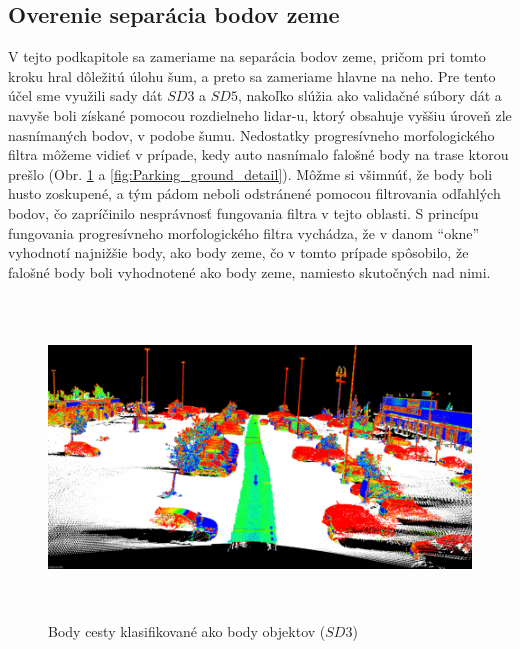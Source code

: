 \subsection{Overenie separácia bodov zeme}
\noindent V tejto podkapitole sa zameriame na separácia bodov zeme, pričom pri tomto kroku hral dôležitú úlohu šum, a preto sa zameriame hlavne na neho. Pre tento účel sme využili sady dát $SD3$ a $SD5$, nakoľko slúžia ako validačné súbory dát a navyše boli získané pomocou rozdielneho \acrshort{lidar}-u, ktorý obsahuje vyššiu úroveň zle nasnímaných bodov, v podobe šumu.
\newline\indent Nedostatky progresívneho morfologického filtra môžeme vidieť v prípade, kedy auto nasnímalo falošné body na trase ktorou prešlo (Obr. \ref{fig:Parking_ground} a  \ref{fig:Parking_ground_detail}). Môžme si všimnúť, že body boli husto zoskupené, a tým pádom neboli odstránené pomocou filtrovania odľahlých bodov, čo zapríčinilo nesprávnosť fungovania filtra v tejto oblasti. S princípu fungovania progresívneho morfologického filtra vychádza, že v danom ``okne''  vyhodnotí najnižšie body, ako body zeme, čo v tomto prípade spôsobilo, že falošné body boli vyhodnotené ako body zeme, namiesto skutočných nad nimi.

\begin{figure}[!htbp]
  \centering
  \includegraphics[width=16cm, height=8.5cm]{img/Parking_ground.png}
  \caption{Body cesty klasifikované ako body objektov ($SD3$)} 
  \label{fig:Parking_ground}
\end{figure}

